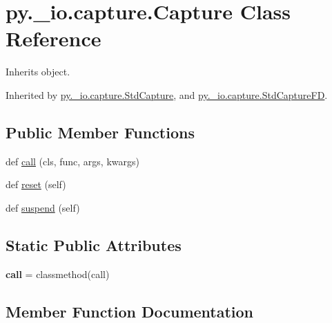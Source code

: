 \hypertarget{classpy_1_1__io_1_1capture_1_1_capture}{}\section{py.\+\_\+io.\+capture.\+Capture Class Reference}
\label{classpy_1_1__io_1_1capture_1_1_capture}


Inherits object.



Inherited by \hyperlink{classpy_1_1__io_1_1capture_1_1_std_capture}{py.\+\_\+io.\+capture.\+Std\+Capture}, and \hyperlink{classpy_1_1__io_1_1capture_1_1_std_capture_f_d}{py.\+\_\+io.\+capture.\+Std\+Capture\+FD}.

\subsection*{Public Member Functions}
\begin{DoxyCompactItemize}
\item 
def \hyperlink{classpy_1_1__io_1_1capture_1_1_capture_a9913c2f9434963bf6a441d9bc5c97128}{call} (cls, func, args, kwargs)
\item 
def \hyperlink{classpy_1_1__io_1_1capture_1_1_capture_a99e7e674860c89df28cf6e69f21d980b}{reset} (self)
\item 
def \hyperlink{classpy_1_1__io_1_1capture_1_1_capture_a132a04942f64cf541807c290ddedc644}{suspend} (self)
\end{DoxyCompactItemize}
\subsection*{Static Public Attributes}
\begin{DoxyCompactItemize}
\item 
\mbox{\label{classpy_1_1__io_1_1capture_1_1_capture_a6460b36d8687a469cf616afa7fca6440}} 
{\bfseries call} = classmethod(call)
\end{DoxyCompactItemize}


\subsection{Member Function Documentation}
\mbox{\label{classpy_1_1__io_1_1capture_1_1_capture_a9913c2f9434963bf6a441d9bc5c97128}} 
